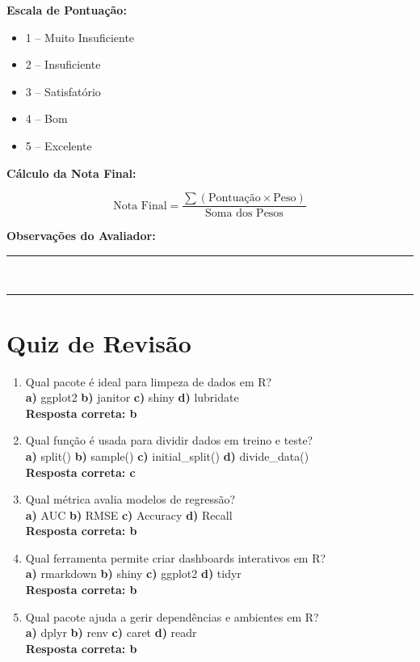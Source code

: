 \documentclass[12pt]{article}
\begin{document}
\textbf{Escala de Pontuação:}
\begin{itemize}
  \item 1 – Muito Insuficiente
  \item 2 – Insuficiente
  \item 3 – Satisfatório
  \item 4 – Bom
  \item 5 – Excelente
\end{itemize}

\textbf{Cálculo da Nota Final:}  


\[
\text{Nota Final} = \frac{\sum (\text{Pontuação} \times \text{Peso})}{\text{Soma dos Pesos}}
\]



\textbf{Observações do Avaliador:} \\
\rule{\textwidth}{0.4pt} \\
\vspace{1cm}
\rule{\textwidth}{0.4pt}



\section*{Quiz de Revisão}

\begin{enumerate}
  \item Qual pacote é ideal para limpeza de dados em R?\\
  \textbf{a)} ggplot2 \quad \textbf{b)} janitor \quad \textbf{c)} shiny \quad \textbf{d)} lubridate\\
  \textbf{Resposta correta: b}

  \item Qual função é usada para dividir dados em treino e teste?\\
  \textbf{a)} split() \quad \textbf{b)} sample() \quad \textbf{c)} initial\_split() \quad \textbf{d)} divide\_data()\\
  \textbf{Resposta correta: c}

  \item Qual métrica avalia modelos de regressão?\\
  \textbf{a)} AUC \quad \textbf{b)} RMSE \quad \textbf{c)} Accuracy \quad \textbf{d)} Recall\\
  \textbf{Resposta correta: b}

  \item Qual ferramenta permite criar dashboards interativos em R?\\
  \textbf{a)} rmarkdown \quad \textbf{b)} shiny \quad \textbf{c)} ggplot2 \quad \textbf{d)} tidyr\\
  \textbf{Resposta correta: b}

  \item Qual pacote ajuda a gerir dependências e ambientes em R?\\
  \textbf{a)} dplyr \quad \textbf{b)} renv \quad \textbf{c)} caret \quad \textbf{d)} readr\\
  \textbf{Resposta correta: b}
\end{enumerate}
\end{document}
